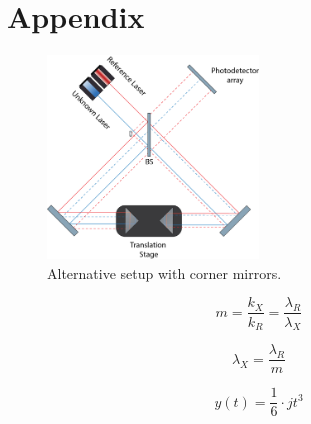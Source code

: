 \documentclass[12pt, twoside]{report}
\begin{document}
  


\appendix
\chapter{Appendix}\label{apx:morestuff}

\begin{figure}[H]
    \centering
    \includegraphics[width=0.5\textwidth]{figs/cor-setup.png}
    \caption{Alternative setup with corner mirrors.}
    \label{fig:cor-mirr-setup}
\end{figure}

\begin{equation}
    m = \frac{k_X}{k_R} = \frac{\lambda_R}{\lambda_X}
\end{equation}

\begin{equation}
    \lambda_X = \frac{\lambda_R}{m}
\end{equation}

\begin{equation}
y(t) = \frac{1}{6} \cdot j t^3
\end{equation}
\end{document}
